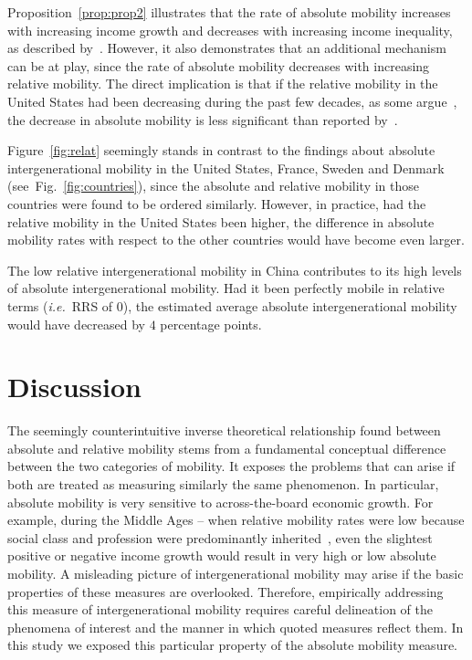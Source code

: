 \documentclass[12pt,a4paper]{article}
\newcommand{\Pref}[1]{Proposition~\ref{prop:#1}}
\newcommand{\ie}{{\it i.e.}\ }
\newcommand{\fref}[1]{Fig.~\ref{fig:#1}}
\newcommand{\Fref}[1]{Figure~\ref{fig:#1}}
\numberwithin{equation}{section}
\begin{document}
\Pref{prop2} illustrates that the rate of absolute mobility increases with increasing income growth and decreases with increasing income inequality, as described by~\citet{chetty2017fading}. However, it also demonstrates that an additional mechanism can be at play, since the rate of absolute mobility decreases with increasing relative mobility. The direct implication is that if the relative mobility in the United States had been decreasing during the past few decades, as some argue~\citep{aaronson2008intergenerational,putnam2012growing}, the decrease in absolute mobility is less significant than reported by~\citet{chetty2017fading}.

\Fref{relat} seemingly stands in contrast to the findings about absolute intergenerational mobility in the United States, France, Sweden and Denmark (see~\fref{countries}), since the absolute and relative mobility in those countries were found to be ordered similarly. However, in practice, had the relative mobility in the United States been higher, the difference in absolute mobility rates with respect to the other countries would have become even larger.

The low relative intergenerational mobility in China contributes to its high levels of absolute intergenerational mobility. Had it been perfectly mobile in relative terms (\ie RRS of $0$), the estimated average absolute intergenerational mobility would have decreased by $4$ percentage points.

\section{Discussion}

The seemingly counterintuitive inverse theoretical relationship found between absolute and relative mobility stems from a fundamental conceptual difference between the two categories of mobility. It exposes the problems that can arise if both are treated as measuring similarly the same phenomenon. In particular, absolute mobility is very sensitive to across-the-board economic growth. For example, during the Middle Ages -- when relative mobility rates were low because social class and profession were predominantly inherited~\citep{goldthorpe1982social,clark2014also}, even the slightest positive or negative income growth would result in very high or low absolute mobility. A misleading picture of intergenerational mobility may arise if the basic properties of these measures are overlooked. Therefore, empirically addressing this measure of intergenerational mobility requires careful delineation of the phenomena of interest and the manner in which quoted measures reflect them. In this study we exposed this particular property of the absolute mobility measure.
\end{document}
